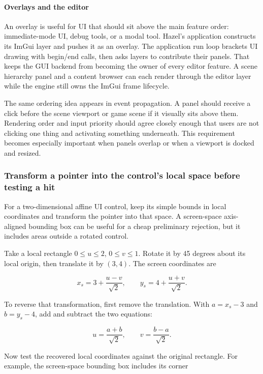 \paragraph{Overlays and the editor}\label{overlays-and-the-editor}

An overlay is useful for UI that should sit above the main feature order: immediate-mode UI, debug tools, or a modal tool. Hazel's application constructs its ImGui layer and pushes it as an overlay. The application run loop brackets UI drawing with begin/end calls, then asks layers to contribute their panels. That keeps the GUI backend from becoming the owner of every editor feature. A scene hierarchy panel and a content browser can each render through the editor layer while the engine still owns the ImGui frame lifecycle.

The same ordering idea appears in event propagation. A panel should receive a click before the scene viewport or game scene if it visually sits above them. Rendering order and input priority should agree closely enough that users are not clicking one thing and activating something underneath. This requirement becomes especially important when panels overlap or when a viewport is docked and resized.

\subsubsection{Transform a pointer into the control's local space before testing a hit}\label{transform-a-pointer-into-the-controls-local-space-before-testing-a-hit}

For a two-dimensional affine UI control, keep its simple bounds in local coordinates and transform the pointer into that space. A screen-space axis-aligned bounding box can be useful for a cheap preliminary rejection, but it includes areas outside a rotated control.

Take a local rectangle \(0\leq u\leq2\), \(0\leq v\leq1\). Rotate it by 45 degrees about its local origin, then translate it by \((3,4)\). The screen coordinates are

\[
x_s=3+\frac{u-v}{\sqrt2},\qquad
y_s=4+\frac{u+v}{\sqrt2}.
\]

To reverse that transformation, first remove the translation. With \(a=x_s-3\) and \(b=y_s-4\), add and subtract the two equations:

\[
u=\frac{a+b}{\sqrt2},\qquad
v=\frac{b-a}{\sqrt2}.
\]

Now test the recovered local coordinates against the original rectangle. For example, the screen-space bounding box includes its corner

